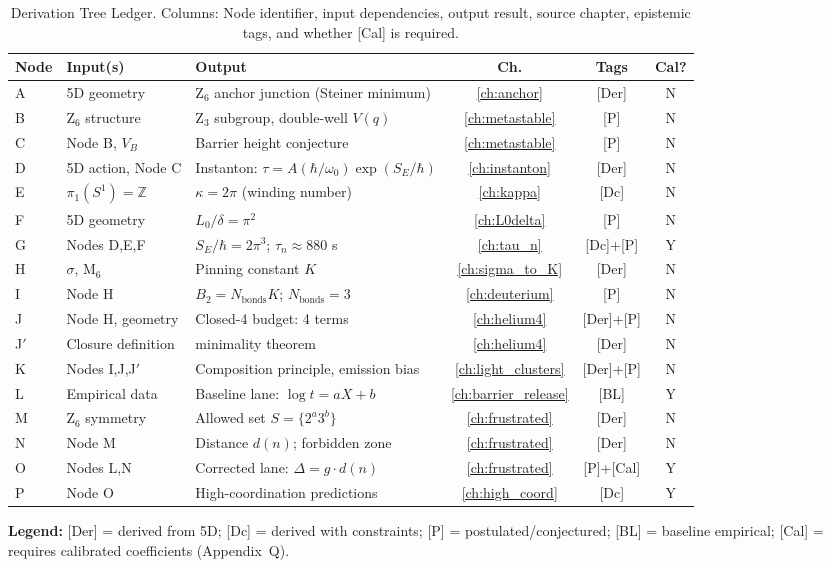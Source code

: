 \begin{table}[htbp]
\centering
\caption{Derivation Tree Ledger. Columns: Node identifier, input dependencies,
output result, source chapter, epistemic tags, and whether [Cal] is required.}
\label{tab:unified:tree}
\small
\begin{tabular}{lp{2.5cm}p{3.5cm}ccc}
    \toprule
    Node & Input(s) & Output & Ch. & Tags & Cal? \\
    \midrule
    A & 5D geometry & Z$_6$ anchor junction (Steiner minimum) &
        \ref{ch:anchor} & [Der] & N \\
    B & Z$_6$ structure & Z$_3$ subgroup, double-well $V(q)$ &
        \ref{ch:metastable} & [P] & N \\
    C & Node B, $V_B$ & Barrier height conjecture &
        \ref{ch:metastable} & [P] & N \\
    D & 5D action, Node C & Instanton: $\tau = A(\hbar/\omega_0)\exp(S_E/\hbar)$ &
        \ref{ch:instanton} & [Der] & N \\
    E & $\pi_1(S^1) = \mathbb{Z}$ & $\kappa = 2\pi$ (winding number) &
        \ref{ch:kappa} & [Dc] & N \\
    F & 5D geometry & $L_0/\delta = \pi^2$ &
        \ref{ch:L0delta} & [P] & N \\
    G & Nodes D,E,F & $S_E/\hbar = 2\pi^3$; $\tau_n \approx 880$ s &
        \ref{ch:tau_n} & [Dc]+[P] & Y \\
    H & $\sigma$, M$_6$ & Pinning constant $K$ &
        \ref{ch:sigma_to_K} & [Der] & N \\
    I & Node H & $B_2 = N_{\text{bonds}} K$; $N_{\text{bonds}} = 3$ &
        \ref{ch:deuterium} & [P] & N \\
    J & Node H, geometry & Closed-4 budget: 4 terms &
        \ref{ch:helium4} & [Der]+[P] & N \\
    J$'$ & Closure definition & \ClosedFour{} minimality theorem &
        \ref{ch:helium4} & [Der] & N \\
    K & Nodes I,J,J$'$ & Composition principle, emission bias &
        \ref{ch:light_clusters} & [Der]+[P] & N \\
    L & Empirical data & Baseline lane: $\log t = aX + b$ &
        \ref{ch:barrier_release} & [BL] & Y \\
    M & Z$_6$ symmetry & Allowed set $S = \{2^a 3^b\}$ &
        \ref{ch:frustrated} & [Der] & N \\
    N & Node M & Distance $d(n)$; forbidden zone &
        \ref{ch:frustrated} & [Der] & N \\
    O & Nodes L,N & Corrected lane: $\Delta = g \cdot d(n)$ &
        \ref{ch:frustrated} & [P]+[Cal] & Y \\
    P & Node O & High-coordination predictions &
        \ref{ch:high_coord} & [Dc] & Y \\
    \bottomrule
\end{tabular}

\vspace{2mm}
\footnotesize
\textbf{Legend:}
[Der] = derived from 5D; [Dc] = derived with constraints;
[P] = postulated/conjectured; [BL] = baseline empirical;
[Cal] = requires calibrated coefficients (Appendix~Q).
\end{table}

